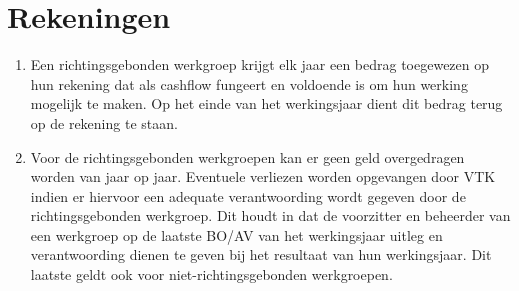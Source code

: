 \section{Rekeningen}
\begin{enumerate}
    \item Een richtingsgebonden werkgroep krijgt elk jaar een bedrag toegewezen op hun rekening dat als cashflow fungeert en voldoende is om hun werking mogelijk te maken. Op het einde van het werkingsjaar dient dit bedrag terug op de rekening te staan.
    \item Voor de richtingsgebonden werkgroepen kan er geen geld overgedragen worden van jaar op jaar. Eventuele verliezen worden opgevangen door VTK indien er hiervoor een adequate verantwoording wordt gegeven door de richtingsgebonden werkgroep. Dit houdt in dat de voorzitter en beheerder van een werkgroep op de laatste BO/AV van het werkingsjaar uitleg en verantwoording dienen te geven bij het resultaat van hun werkingsjaar. Dit laatste geldt ook voor niet-richtingsgebonden werkgroepen.
\end{enumerate}

